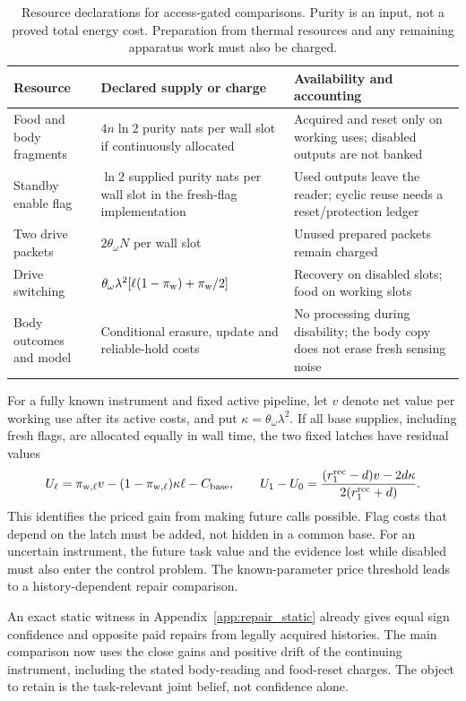 \documentclass[12pt]{article}
\theoremstyle{definition}
\begin{document}
\begin{table}[ht]
\centering\small
\begin{tabular}{@{}P{3.2cm}P{4.6cm}P{4.7cm}@{}}
\toprule
Resource & Declared supply or charge & Availability and accounting\\
\midrule
Food and body fragments & $4n\ln2$ purity nats per wall slot if continuously allocated & Acquired and reset only on working uses; disabled outputs are not banked\\[3pt]
Standby enable flag & $\ln2$ supplied purity nats per wall slot in the fresh-flag implementation & Used outputs leave the reader; cyclic reuse needs a reset/protection ledger\\[3pt]
Two drive packets & $2\theta_\omega N$ per wall slot & Unused prepared packets remain charged\\[3pt]
Drive switching & $\theta_\omega\lambda^2[\ell(1-\pi_{\rm w})+\pi_{\rm w}/2]$ & Recovery on disabled slots; food on working slots\\[3pt]
Body outcomes and model & Conditional erasure, update and reliable-hold costs & No processing during disability; the body copy does not erase fresh sensing noise\\
\bottomrule
\end{tabular}
\caption{Resource declarations for access-gated comparisons. Purity is an input, not a proved total energy cost. Preparation from thermal resources and any remaining apparatus work must also be charged.}
\label{tab:body_access_ledger}
\end{table}

For a fully known instrument and fixed active pipeline, let $v$ denote net value per working use after its active costs, and put $\kappa=\theta_\omega\lambda^2$. If all base supplies, including fresh flags, are allocated equally in wall time, the two fixed latches have residual values
\[
 U_\ell=\pi_{{\rm w},\ell}v-(1-\pi_{{\rm w},\ell})\kappa\ell-C_{\rm base},
 \qquad U_1-U_0=\frac{(r_1^{\rm rec}-d)v-2d\kappa}{2(r_1^{\rm rec}+d)}.
\]
This identifies the priced gain from making future calls possible. Flag costs that depend on the latch must be added, not hidden in a common base. For an uncertain instrument, the future task value and the evidence lost while disabled must also enter the control problem. The known-parameter price threshold leads to a history-dependent repair comparison.

An exact static witness in Appendix~\ref{app:repair_static} already
gives equal sign confidence and opposite paid repairs from legally
acquired histories. The main comparison now uses the close gains
and positive drift of the continuing instrument, including the stated
body-reading and food-reset charges. The object to retain is the
task-relevant joint belief, not confidence alone.
\end{document}
